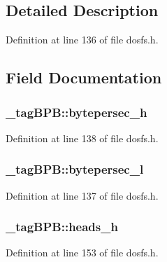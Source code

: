 \subsection{Detailed Description}


Definition at line 136 of file dosfs.\-h.



\subsection{Field Documentation}
\hypertarget{struct__tag_b_p_b_a2a4fd74f8aefcad0745420989433c6bf}{
\subsubsection[{bytepersec\-\_\-h}]{ \-\_\-tag\-B\-P\-B\-::bytepersec\-\_\-h}}\label{struct__tag_b_p_b_a2a4fd74f8aefcad0745420989433c6bf}


Definition at line 138 of file dosfs.\-h.

\hypertarget{struct__tag_b_p_b_abc6e118f3b0bd4d9ca38003a7505f1f7}{
\subsubsection[{bytepersec\-\_\-l}]{ \-\_\-tag\-B\-P\-B\-::bytepersec\-\_\-l}}\label{struct__tag_b_p_b_abc6e118f3b0bd4d9ca38003a7505f1f7}


Definition at line 137 of file dosfs.\-h.

\hypertarget{struct__tag_b_p_b_a89970cb51f94d482caa1ae73c7aeb132}{
\subsubsection[{heads\-\_\-h}]{ \-\_\-tag\-B\-P\-B\-::heads\-\_\-h}}\label{struct__tag_b_p_b_a89970cb51f94d482caa1ae73c7aeb132}


Definition at line 153 of file dosfs.\-h.


